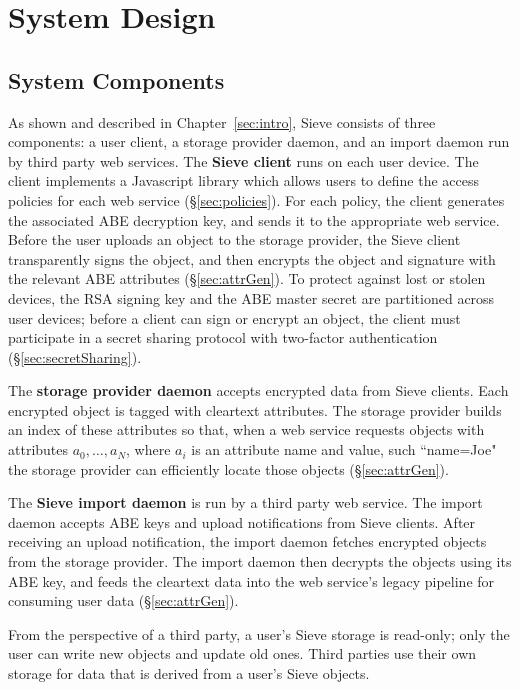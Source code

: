 \chapter{System Design}
\label{sec:design}

\section{System Components}
As shown and described in Chapter~\ref{sec:intro}, 
Sieve
consists of three components: a user client,
a storage provider daemon, and an import
daemon run by third party web
services. The \textbf{Sieve client} runs
on each user device. The client implements
a Javascript library which allows users to define the
access policies for each web service
(\S\ref{sec:policies}). For each policy, the
client generates the associated ABE
decryption key, and sends it to the
appropriate web service. Before the user
uploads an object to the storage provider,
the Sieve client transparently signs the
object, and then
encrypts the object and signature with the
relevant ABE attributes (\S\ref{sec:attrGen}).
To protect against lost or stolen devices,
the RSA signing key and the ABE master secret
are partitioned across user devices; before a
client can sign or encrypt an object, the
client must participate in a secret sharing
protocol with two-factor authentication
(\S\ref{sec:secretSharing}).

The \textbf{storage provider daemon}
accepts encrypted data from Sieve clients.
Each encrypted object is tagged with
cleartext attributes. The storage provider
builds an index of these attributes so
that, when a web service requests objects
with attributes $a_0,\ldots,a_N$, where $a_i$
is an attribute name and value, such ``name=Joe" 
the storage provider can efficiently locate
those objects (\S\ref{sec:attrGen}).

The \textbf{Sieve import daemon} is run
by a third party web service. The import
daemon accepts ABE keys and upload
notifications from Sieve clients. After
receiving an upload notification, the import
daemon fetches encrypted objects from the
storage provider. The import daemon then
decrypts the objects using its ABE key,
and feeds the cleartext data into the
web service's legacy pipeline for consuming
user data (\S\ref{sec:attrGen}).

From the perspective of a third party,
a user's Sieve storage is read-only;
only the user can write
new objects and update old ones. Third
parties use their own storage for data
that is derived from a user's Sieve
objects.


